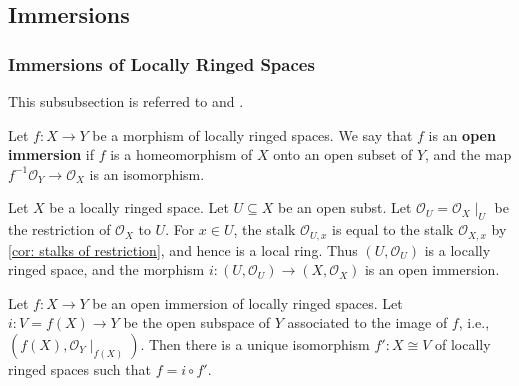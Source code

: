 \documentclass[11pt]{article}
\begin{document}
\subsection{Immersions}
\subsubsection{Immersions of Locally Ringed Spaces}
This subsubsection is referred to \cite[\href{https://stacks.math.columbia.edu/tag/01HD}{Section 01HD}]{stacks} 
and \cite[\href{https://stacks.math.columbia.edu/tag/01HJ}{Tag 01HJ}]{stacks}. 

\begin{definition}
    Let $ f: X \to Y $ be a morphism of locally ringed spaces. We say that $ f $ is an \textbf{open immersion} 
    if $ f $ is a homeomorphism of $ X $ onto an open subset of $ Y $, and the map $ f^{-1}\mathscr{O}_{Y} \to \mathscr{O}_{X} $ 
    is an isomorphism.  
\end{definition}

\begin{example}
    Let $ X $ be a locally ringed space. Let $ U \subseteq X $ 
    be an open subst. Let $ \mathscr{O}_{U} = \mathscr{O}_{X}\mid_{U} $ 
    be the restriction of $ \mathscr{O}_{X} $ to $ U $. 
    For $ x \in U $, the stalk $ \mathscr{O}_{U,x} $ is equal to 
    the stalk $ \mathscr{O}_{X,x} $ by \autoref{cor: stalks of restriction}, 
    and hence is a local ring. Thus $ (U,\mathscr{O}_{U}) $ 
    is a locally ringed space, and the morphism $ i:(U,\mathscr{O}_{U})\to(X,\mathscr{O}_{X}) $ 
    is an open immersion. 
\end{example}

\begin{lemma}
    \label{lemma: uniqueness of open immersion}
    \cite[\href{https://stacks.math.columbia.edu/tag/01HH}{Lemma 01HH}]{stacks}
    Let $ f: X \to Y $ be an open immersion of locally ringed spaces. 
    Let $ i: V=f(X) \to Y $ be the open subspace of $ Y $ 
    associated to the image of $ f $, i.e., $ (f(X),\mathscr{O}_{Y}\mid_{f(X)}) $. 
    Then there is a unique isomorphism $ f' : X \cong V $ 
    of locally ringed spaces such that $ f = i \circ f' $. 
\end{lemma}
\end{document}
